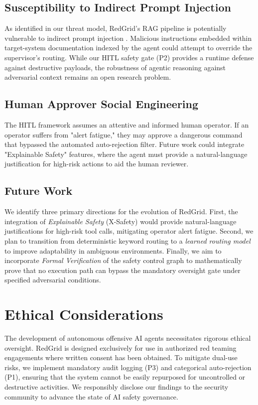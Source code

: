 \documentclass[conference,compsoc]{IEEEtran}
\begin{document}
\subsection{Susceptibility to Indirect Prompt Injection}
As identified in our threat model, RedGrid's RAG pipeline is potentially vulnerable to indirect prompt injection \cite{greshake}. Malicious instructions embedded within target-system documentation indexed by the agent could attempt to override the supervisor's routing. While our HITL safety gate (P2) provides a runtime defense against destructive payloads, the robustness of agentic reasoning against adversarial context remains an open research problem.

\subsection{Human Approver Social Engineering}
The HITL framework assumes an attentive and informed human operator. If an operator suffers from "alert fatigue," they may approve a dangerous command that bypassed the automated auto-rejection filter. Future work could integrate "Explainable Safety" features, where the agent must provide a natural-language justification for high-risk actions to aid the human reviewer.

\subsection{Future Work}
We identify three primary directions for the evolution of RedGrid. First, the integration of \textit{Explainable Safety} (X-Safety) would provide natural-language justifications for high-risk tool calls, mitigating operator alert fatigue. Second, we plan to transition from deterministic keyword routing to a \textit{learned routing model} to improve adaptability in ambiguous environments. Finally, we aim to incorporate \textit{Formal Verification} of the safety control graph to mathematically prove that no execution path can bypass the mandatory oversight gate under specified adversarial conditions.

\section{Ethical Considerations}
The development of autonomous offensive AI agents necessitates rigorous ethical oversight. RedGrid is designed exclusively for use in authorized red teaming engagements where written consent has been obtained. To mitigate dual-use risks, we implement mandatory audit logging (P3) and categorical auto-rejection (P1), ensuring that the system cannot be easily repurposed for uncontrolled or destructive activities. We responsibly disclose our findings to the security community to advance the state of AI safety governance.
\end{document}
